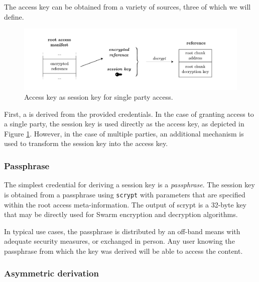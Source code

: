 The access key can be obtained from a variety of sources, three of which we will define.

\begin{figure}[htbp]
\hspace{-1cm}
\includegraphics[width=1.2\textwidth]{fig/access-control-single-party.pdf}
\caption[Access key as session key for single party access  \statusyellow]{Access key as session key for single party access.}
\label{fig:access-control-single-party}
\end{figure}

First, a  is derived from the provided credentials. In the case of granting access to a single party, the session key is used directly as the access key, as depicted in Figure \ref{fig:access-control-single-party}. However, in the case of multiple parties, an additional mechanism is used to transform the session key into the access key.

\subsubsection{Passphrase}
The simplest credential for deriving a session key is a \emph{passphrase}. The session key is obtained from a passphrase using \lstinline{scrypt} with parameters that are specified within the root access meta-information. The output of scrypt is a 32-byte key that may be directly used for Swarm encryption and decryption algorithms.

In typical use cases, the passphrase is distributed by an off-band means with adequate security measures, or exchanged in person. Any user knowing the passphrase from which the key was derived will be able to access the content.

\subsubsection{Asymmetric derivation}

